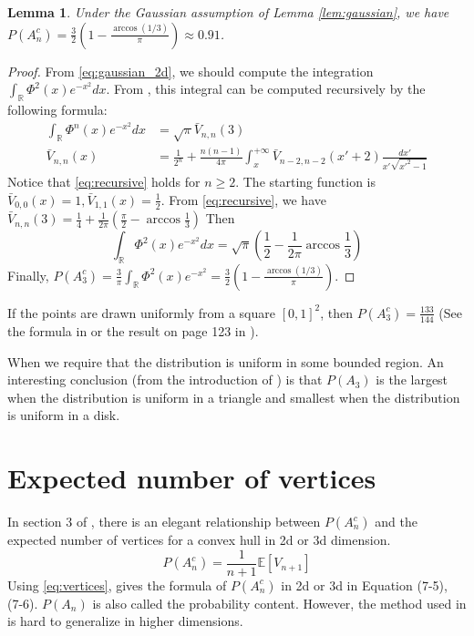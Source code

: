 \documentclass{article}
\newtheorem{lemma}{Lemma}
\def\E{\mathbb{E}}
\begin{document}
\begin{lemma}
    Under the Gaussian assumption of
    Lemma \ref{lem:gaussian},
    we have $P(A_n^c)=\frac{3}{2}
    (1-\frac{\arccos(1/3)}{\pi})
    \approx 0.91$.
\end{lemma}
\begin{proof}
From  \eqref{eq:gaussian_2d},
we should compute the integration
$\int_{\mathbb{R}} \Phi^2(x)e^{-x^2}
dx$.
From \cite{ruben1954moments},
this integral can be computed recursively
by the following formula:
\begin{align}
    \int_{\mathbb{R}} \Phi^n(x)e^{-x^2}
    dx &= \sqrt{\pi} \bar{V}_{n,n}(3) \\
    \bar{V}_{n,n}(x)
    &=\frac{1}{2^n}
    + \frac{n(n-1)}{4\pi}
    \int_{x}^{+\infty}
    \bar{V}_{n-2,n-2}(x'+2)
    \frac{dx'}{x'\sqrt{x'^2-1}}
    \label{eq:recursive}
\end{align}
Notice that \eqref{eq:recursive}
holds for $n\geq 2$. The starting
function is $\bar{V}_{0,0}(x)=1
,\bar{V}_{1,1}(x)=\frac{1}{2}$.
From \eqref{eq:recursive},
we have $\bar{V}_{n,n}(3)=
\frac{1}{4} + \frac{1}{2\pi}
(\frac{\pi}{2} - \arccos\frac{1}{3})
$
Then
\begin{equation}
\int_{\mathbb{R}} \Phi^2(x)e^{-x^2}
dx = \sqrt{\pi}(\frac{1}{2} - \frac{1}{2\pi}\arccos\frac{1}{3})
\end{equation}
Finally,
$P(A_3^c)=\frac{3}{\pi}
\int_{\mathbb{R}} \Phi^2(x)e^{-x^2}
=\frac{3}{2}
(1-\frac{\arccos(1/3)}{\pi})
$.
\end{proof}
If the points are drawn uniformly
from a square $[0,1]^2$, then
$P(A_3^c)=\frac{133}{144}$
(See the formula in \cite{valtr1995probability}
or the result on page 123 in \cite{henze1983random}).

When we require that the distribution is uniform in some bounded region.
An interesting conclusion (from the introduction of \cite{barany2008random})
is that $P(A_3)$ is the largest when
the distribution is uniform in a triangle and
smallest when the distribution is uniform in a disk.

\section{Expected number of vertices}
In section 3 of \cite{efron1965convex},
there is an elegant relationship between
$P(A_n^c)$ and the expected number of vertices
for a convex hull in 2d or 3d dimension.
\begin{equation}\label{eq:vertices}
P(A_n^c) = \frac{1}{n+1}\E[V_{n+1}]
\end{equation}
Using \eqref{eq:vertices}, 
\cite{efron1965convex} gives the formula
of $P(A_n^c)$ in 2d or 3d in Equation (7-5), (7-6).
$P(A_n)$ is also called the probability content.
However, the method used in 
\cite{efron1965convex} is hard to generalize in
higher dimensions.
\end{document}
